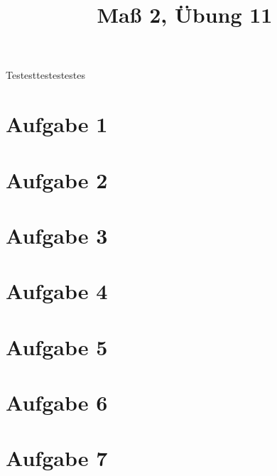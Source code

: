 \documentclass[]{article}
\author{}
\title{Maß 2, Übung 11}
\begin{document}
    \begin{titlepage}
        \maketitle
    \end{titlepage}
    Testesttestestestes
    \section{Aufgabe 1}
    
    \section{Aufgabe 2}
    
    \section{Aufgabe 3}
    
    \section{Aufgabe 4}
    
    \section{Aufgabe 5}
    
    \section{Aufgabe 6}
    
    \section{Aufgabe 7}
    
    
    
    
\end{document}
